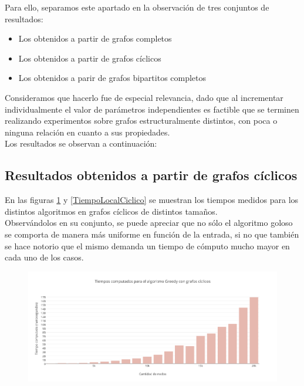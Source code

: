 Para ello, separamos este apartado en la observación de tres conjuntos de resultados:

\begin{itemize}
\item {Los obtenidos a partir de grafos completos}
\item {Los obtenidos a partir de grafos cíclicos}
\item {Los obtenidos a parir de grafos bipartitos completos}
\end{itemize}

Consideramos que hacerlo fue de especial relevancia, dado que al incrementar individualmente el valor de parámetros independientes es factible que se terminen realizando experimentos sobre grafos estructuralmente distintos, con poca o ninguna relación en cuanto a sus propiedades.\\
Los resultados se observan a continuación:\\


\subsection {Resultados obtenidos a partir de grafos cíclicos}

En las figuras \ref{TiempoGreedyCiclico} y \ref{TiempoLocalCiclico} se muestran los tiempos medidos para los distintos algoritmos en grafos cíclicos de distintos tamaños. \\
Observándolos en su conjunto, se puede apreciar que no sólo el algoritmo goloso se comporta de manera más uniforme en función de la entrada, si no que también se hace notorio que el mismo demanda un tiempo de cómputo mucho mayor en cada uno de los casos.\\

\begin{figure}[H]
    \centering
  	\includegraphics[width=18cm]{imagenes/Ej5/TiempoGreedyCiclico.png}
    \caption{}
 	  \label{TiempoGreedyCiclico}
  \end{figure}

